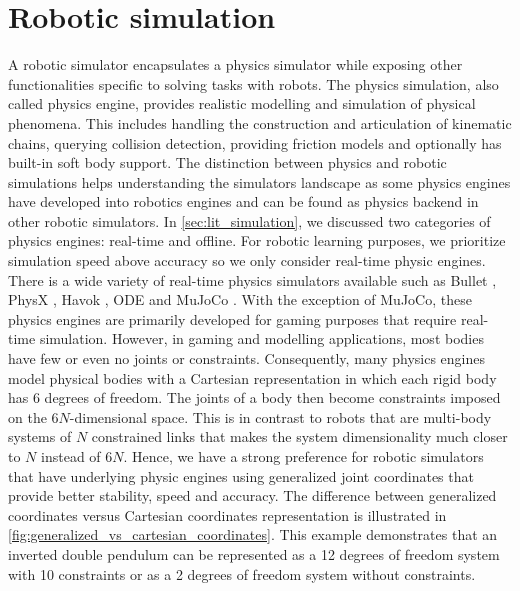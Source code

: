 \documentclass[\home/main.tex]{subfiles}
\begin{document}

\section{Robotic simulation}

A robotic simulator encapsulates a physics simulator while exposing other functionalities specific to solving tasks with robots. The physics simulation, also called physics engine, provides realistic modelling and simulation of physical phenomena. This includes handling the construction and articulation of kinematic chains, querying collision detection, providing friction models and optionally has built-in soft body support.
The distinction between physics and robotic simulations helps understanding the simulators landscape as some physics engines have developed into robotics engines and can be found as physics backend in other robotic simulators.
In \cref{sec:lit_simulation}, we discussed two categories of physics engines: real-time and offline. For robotic learning purposes, we prioritize simulation speed above accuracy so we only consider real-time physic engines. There is a wide variety of real-time physics simulators available such as Bullet \autocite{Bullet}, PhysX \autocite{PhysX}, Havok \autocite{Havok}, ODE \autocite{ODE} and MuJoCo \autocite{Mujoco}.
With the exception of MuJoCo, these physics engines are primarily developed for gaming purposes that require real-time simulation. However, in gaming and modelling applications, most bodies have few or even no joints or constraints. Consequently, many physics engines model physical bodies with a Cartesian representation in which each rigid body has 6 degrees of freedom. The joints of a body then become constraints imposed on the $6N$-dimensional space. This is in contrast to robots that are multi-body systems of $N$ constrained links that makes the system dimensionality much closer to $N$ instead of $6N$. Hence, we have a strong preference for robotic simulators that have underlying physic engines using generalized joint coordinates that provide better stability, speed and accuracy. The difference between generalized coordinates versus Cartesian coordinates representation is illustrated in \cref{fig:generalized_vs_cartesian_coordinates}. This example demonstrates that an inverted double pendulum can be represented as a 12 degrees of freedom system with 10 constraints or as a 2 degrees of freedom system without constraints.
\end{document}

